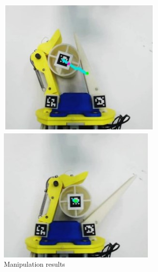 \documentclass[a4paper,twoside,12pt,papersize, dvipdfmx]{iirthesis}
\begin{document}
\begin{figure}[b]
\begin{minipage}{0.24\hsize}
\subcaption{}
\end{minipage}	\hfill
\begin{minipage}{0.24\hsize}
\centering
\includegraphics[width=\hsize]{fig/Introduction/bircher/mani_c.jpg}
\subcaption{}
\end{minipage}	\hfill
\begin{minipage}{0.24\hsize}
\centering
\includegraphics[width=\hsize]{fig/Introduction/bircher/mani_d.jpg}
\subcaption{}
\end{minipage}	\hfill
\caption{Manipulation results \cite{bircher2019}}
\label{fig::manires}
\end{figure}
\end{document}
